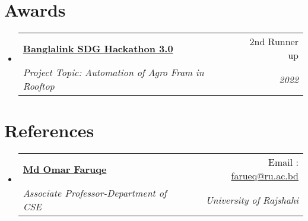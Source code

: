 \documentclass[a4paper,11pt]{article}
\makeatletter
\newcommand{\resumeSubheading}[4]{
    \vspace{-1pt}\item
    \begin{tabular*}{0.97\textwidth}{l@{\extracolsep{\fill}}r}
        \textbf{#1}       & #2                 \\
        \textit{\small#3} & \textit{\small #4} \\
    \end{tabular*}\vspace{-5pt}
}
\newcommand{\resumeSubHeadingListStart}{\begin{itemize}[leftmargin=*]}
\newcommand{\resumeSubHeadingListEnd}{\end{itemize}}
\makeatother
\begin{document}
\section{Awards}
\resumeSubHeadingListStart

\resumeSubheading
{\href{https://www.dhakatribune.com/business/2022/09/03/banglalink-sdg-hackathon-code-for-a-cause-30-finale-held}{Banglalink SDG Hackathon 3.0}}{2nd Runner up}
{Project Topic: Automation of Agro Fram in Rooftop}{2022}



\resumeSubHeadingListEnd


\section{References}
\resumeSubHeadingListStart

\resumeSubheading
{\href{http://rurfid.ru.ac.bd/ru_profile/public/teacher/22706111/profile}{Md Omar Faruqe}}{Email : \href{farueq@ru.ac.bd}{farueq@ru.ac.bd}}
{Associate Professor-Department of CSE}{University of Rajshahi}


\resumeSubHeadingListEnd

\end{document}
